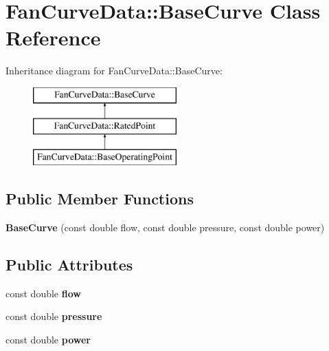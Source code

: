 \hypertarget{class_fan_curve_data_1_1_base_curve}{}\section{Fan\+Curve\+Data\+:\+:Base\+Curve Class Reference}
\label{class_fan_curve_data_1_1_base_curve}
Inheritance diagram for Fan\+Curve\+Data\+:\+:Base\+Curve\+:\begin{figure}[H]
\begin{center}
\leavevmode
\includegraphics[height=3.000000cm]{d8/d43/class_fan_curve_data_1_1_base_curve}
\end{center}
\end{figure}
\subsection*{Public Member Functions}
\begin{DoxyCompactItemize}
\item 
\mbox{\label{class_fan_curve_data_1_1_base_curve_a05d0e881e03368efcbab71997ff25f33}} 
{\bfseries Base\+Curve} (const double flow, const double pressure, const double power)
\end{DoxyCompactItemize}
\subsection*{Public Attributes}
\begin{DoxyCompactItemize}
\item 
\mbox{\label{class_fan_curve_data_1_1_base_curve_ab8b4cb389033aa5b58b49cebd8b672c6}} 
const double {\bfseries flow}
\item 
\mbox{\label{class_fan_curve_data_1_1_base_curve_a100c4a42e149760c3f3722dce0b679a3}} 
const double {\bfseries pressure}
\item 
\mbox{\label{class_fan_curve_data_1_1_base_curve_a4282ce2c8fa4150ecf011c9edaa7cb9d}} 
const double {\bfseries power}
\end{DoxyCompactItemize}
